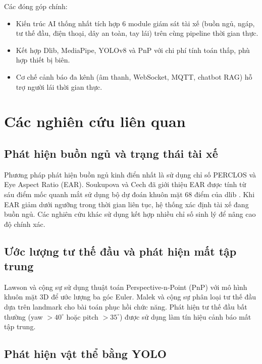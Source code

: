 Các đóng góp chính:

\begin{itemize}[leftmargin=*,nosep]
  \item Kiến trúc AI thống nhất tích hợp 6 module giám sát tài xế (buồn ngủ, ngáp, tư thế đầu, điện thoại, dây an toàn, tay lái) trên cùng pipeline thời gian thực.
  \item Kết hợp Dlib, MediaPipe, YOLOv8 và PnP với chi phí tính toán thấp, phù hợp thiết bị biên.
  \item Cơ chế cảnh báo đa kênh (âm thanh, WebSocket, MQTT, chatbot RAG) hỗ trợ người lái thời gian thực.
\end{itemize}


\section{Các nghiên cứu liên quan}

\subsection{Phát hiện buồn ngủ và trạng thái tài xế}

Phương pháp phát hiện buồn ngủ kinh điển nhất là sử dụng chỉ số PERCLOS và Eye Aspect Ratio (EAR). Soukupova và Cech \cite{soukupova2016} đã giới thiệu EAR được tính từ sáu điểm mốc quanh mắt sử dụng bộ dự đoán khuôn mặt 68 điểm của dlib \cite{king2009}. Khi EAR giảm dưới ngưỡng trong thời gian liên tục, hệ thống xác định tài xế đang buồn ngủ. Các nghiên cứu khác \cite{ji2002, ngxande2017} sử dụng kết hợp nhiều chỉ số sinh lý để nâng cao độ chính xác.

\subsection{Ước lượng tư thế đầu và phát hiện mất tập trung}

Lawson và cộng sự \cite{lawson2020} sử dụng thuật toán Perspective-n-Point (PnP) với mô hình khuôn mặt 3D để ước lượng ba góc Euler. Malek và cộng sự \cite{malek2021} phân loại tư thế đầu dựa trên landmark cho bài toán phục hồi chức năng. Phát hiện tư thế đầu bất thường (yaw $>40^\circ$ hoặc pitch $>35^\circ$) được sử dụng làm tín hiệu cảnh báo mất tập trung.

\subsection{Phát hiện vật thể bằng YOLO}

